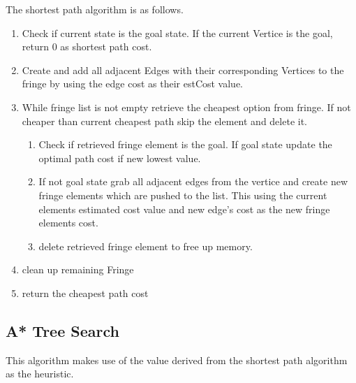 The shortest path algorithm is as follows.
\begin{enumerate}
\item Check if current state is the goal state. If the current Vertice is the
	goal, return 0 as shortest path cost.
\item Create and add all adjacent Edges with their corresponding Vertices to the
	fringe by using the edge cost as their estCost value.
\item While fringe list is not empty retrieve the cheapest option from fringe.
	If not cheaper than current cheapest path skip the element and delete it.
\begin{enumerate}
\item Check if retrieved fringe element is the goal.  If goal state update the
	optimal path cost if new lowest value.
\item	If not goal state grab all adjacent edges from the vertice and create new
	fringe elements which are pushed to the list.  This using the current elements
	estimated cost value and new edge's cost as the new fringe elements cost.
\item delete retrieved fringe element to free up memory.
\end{enumerate}
\item clean up remaining Fringe
\item return the cheapest path cost
\end{enumerate}



\subsection{A* Tree Search}
This algorithm makes use of the value derived from the shortest path algorithm
as the heuristic.


